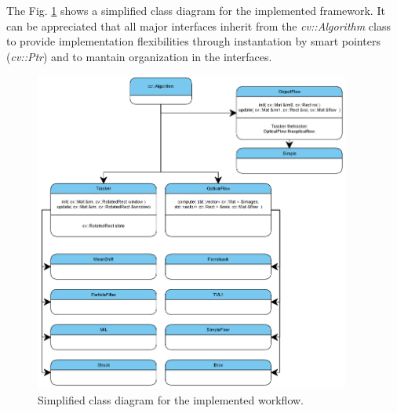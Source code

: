 The Fig. \ref{class} shows a simplified class diagram for the implemented framework. It can be appreciated that all major interfaces inherit from the {\it cv::Algorithm} class to provide 
implementation flexibilities through instantation by smart pointers ({\it cv::Ptr}) and to mantain organization in the interfaces. 

   \begin{figure}[thbp]
      \centering
      \includegraphics[width=0.925\textwidth]{../images/ClassDiagram.png}
      \caption{Simplified class diagram for the implemented workflow.}
      \label{class}
   \end{figure}
	\setlength{\belowcaptionskip}{-10pt}

